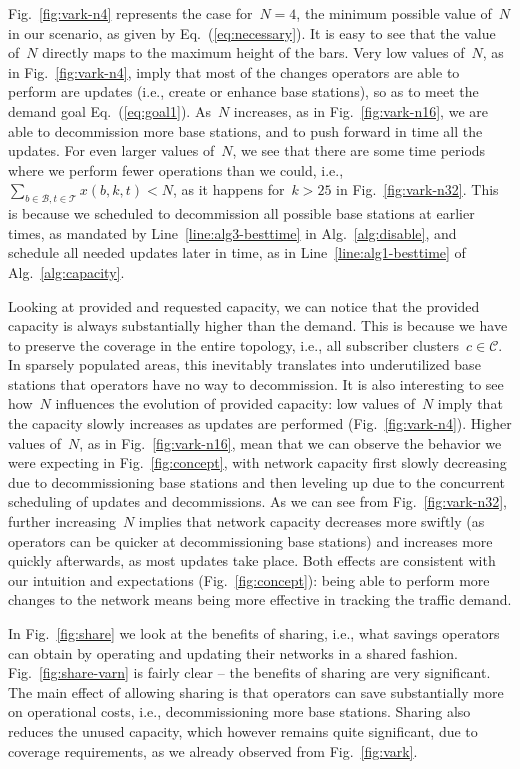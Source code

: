 \documentclass[10pt,journal,cspaper,compsoc]{IEEEtran}
\newcommand{\Fig}[1]{Fig.~\ref{fig:#1}}
\newcommand{\Eq}[1]{Eq.~(\ref{eq:#1})}
\newcommand{\Alg}[1]{Alg.~\ref{alg:#1}}
\newcommand{\Line}[1]{Line~\ref{line:#1}}
\newcommand{\Bc}{\mathcal{B}}
\newcommand{\Cc}{\mathcal{C}}
\newcommand{\Tc}{\mathcal{T}}
\begin{document}
\Fig{vark-n4} represents the case for~$N=4$, the minimum possible value of~$N$ in our scenario, as given by \Eq{necessary}.
It is easy to see that the value of~$N$ directly maps to the maximum height of the bars.
Very low values of~$N$, as in \Fig{vark-n4}, imply that most of the changes operators are
able to perform are updates (i.e., create or enhance base stations), so as to meet the demand goal \Eq{goal1}.
As~$N$ increases, as in \Fig{vark-n16}, we are able to decommission more base stations,
and to push forward in time all the updates.
For even larger values of~$N$, we see that there are some time periods where we perform fewer
operations than we could, i.e.,~$\sum_{b\in\Bc,t\in\Tc}x(b,k,t)<N$,
as it happens for~$k>25$ in \Fig{vark-n32}.
This is because we scheduled to decommission all possible base stations at earlier times,
as mandated by \Line{alg3-besttime} in \Alg{disable},
and schedule all needed updates later in time, as in \Line{alg1-besttime} of \Alg{capacity}.

Looking at provided and requested capacity, we can notice that the provided capacity is always substantially higher
than the demand.
This is because we have to preserve the coverage
in the entire topology, i.e., all subscriber clusters~$c\in\Cc$.
In sparsely populated areas, this inevitably translates into underutilized base stations
that operators have no way to decommission.
It is also interesting to see how~$N$ influences the evolution of provided capacity:
low values of~$N$ imply that the capacity slowly increases as updates are performed
(\Fig{vark-n4}).
Higher values of~$N$, as in \Fig{vark-n16}, mean that we can observe the behavior we were
expecting in \Fig{concept}, with network capacity first slowly decreasing due to decommissioning base
stations and then leveling up due to the concurrent scheduling of updates and decommissions.
As we can see from \Fig{vark-n32}, further increasing~$N$ implies that network capacity decreases
more swiftly (as operators can be quicker at decommissioning base stations) and increases more quickly
afterwards, as most updates take place.
Both effects are consistent with our intuition and expectations (\Fig{concept}): being able to perform more changes to the network means being more effective in tracking the traffic demand.

In \Fig{share} we look at the benefits of sharing, i.e., what savings
operators can obtain by operating and updating their networks in a shared fashion.
\Fig{share-varn} is fairly clear -- the benefits of sharing are very significant.
The main effect of allowing sharing is that operators can save substantially more on operational costs,
i.e., decommissioning more base stations.
Sharing also reduces the unused capacity, which however remains quite significant, due to coverage requirements,
as we already observed from \Fig{vark}.
\end{document}
